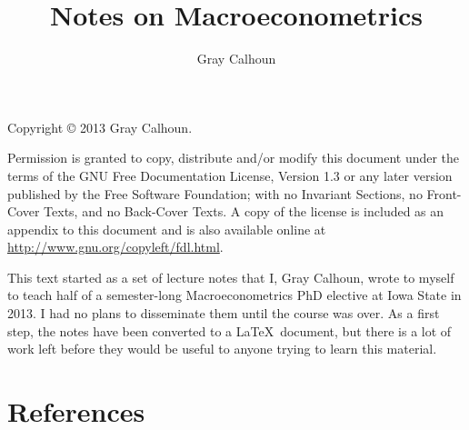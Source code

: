 \documentclass[nohyper]{tufte-handout}
\title{Notes on Macroeconometrics}
\author{Gray Calhoun}
\begin{document}
\maketitle

\bigskip\noindent%
Copyright © 2013 Gray Calhoun.

Permission is granted to copy, distribute and/or modify this document
under the terms of the GNU Free Documentation License, Version 1.3 or
any later version published by the Free Software Foundation; with no
Invariant Sections, no Front-Cover Texts, and no Back-Cover Texts.  A
copy of the license is included as an appendix to this document and is
also available online at \url{http://www.gnu.org/copyleft/fdl.html}.

This text started as a set of lecture notes that I, Gray Calhoun,
wrote to myself to teach half of a semester-long Macroeconometrics PhD
elective at Iowa State in 2013.  I had no plans to disseminate them
until the course was over.  As a first step, the notes have been
converted to a \LaTeX\ document, but there is a lot of work left
before they would be useful to anyone trying to learn this material.

\tableofcontents









\part*{References}

\end{document}
